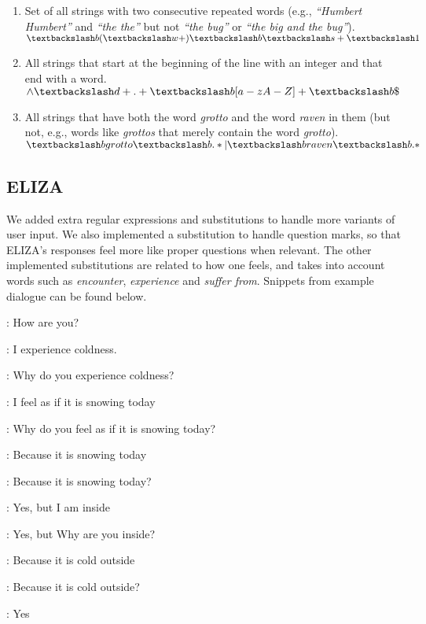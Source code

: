 \documentclass[a4paper, 11pt]{article}
\begin{document}
\begin{enumerate}
	\item Set of all strings with two consecutive repeated words (e.g., \textit{“Humbert Humbert”} and \textit{“the the”} but not \textit{“the bug”} or \textit{“the big and the bug”}). \\ $ \textbackslash b(\textbackslash w+)\textbackslash b \textbackslash s+ \textbackslash1 $
	
	\item All strings that start at the beginning of the line with an integer and that end with a word. \\ $ \wedge \textbackslash d+.+ \textbackslash b[a-zA-Z]+\textbackslash b \$ $
	
	\item All strings that have both the word \textit{grotto} and the word \textit{raven} in them (but not, e.g., words like \textit{grottos} that merely contain the word \textit{grotto}). \\ $ \textbackslash b \space { grotto} \textbackslash b.* | \textbackslash b \space { raven} \textbackslash b.*  $
\end{enumerate}

\subsection{ELIZA}

We added extra regular expressions and substitutions to handle more variants of user input. We also implemented a substitution to handle question marks, so that ELIZA's responses feel more like proper questions when relevant. The other implemented substitutions are related to how one feels, and takes into account words such as \textit{encounter}, \textit{experience} and \textit{suffer from}. Snippets from example dialogue can be found below.

\begin{drama}
	
	\elizaspeaks: How are you?  
	
	\leonspeaks: I experience coldness.
	
	\elizaspeaks: Why do you experience coldness?
	
	\leonspeaks: I feel as if it is snowing today
	
	\elizaspeaks: Why do you feel as if it is snowing today?
	
	\leonspeaks: Because it is snowing today
	
	\elizaspeaks: Because it is snowing today?
	
	\leonspeaks: Yes, but I am inside
	
	\elizaspeaks: Yes, but Why are you inside?
	
	\leonspeaks: Because it is cold outside
	
	\elizaspeaks: Because it is cold outside?
	
	\leonspeaks: Yes
	
\end{drama}
\end{document}
